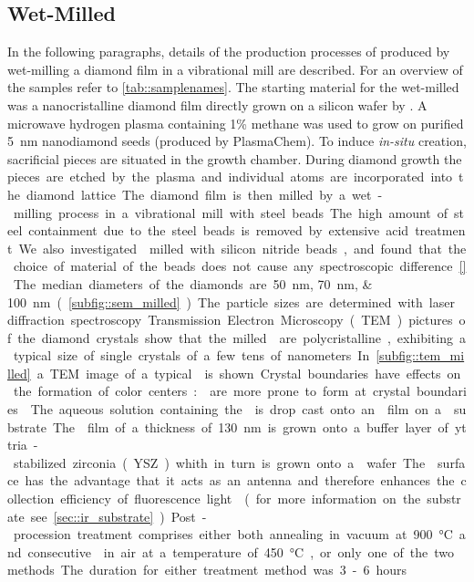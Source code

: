 	\subsection{Wet-Milled \cvd \Nds}\label{subsec::milled_nds}
	In the following paragraphs, details of the production processes of \nd produced by wet-milling a \CVD diamond film in a vibrational mill are described. 
	For an overview of the samples refer to \autoref{tab::samplenames}.
	The starting material for the wet-milled \nds was a nanocristalline diamond film \cite{Williams2006a} directly grown on a silicon wafer by \CVD. 
	A microwave hydrogen plasma containing 1\% methane was used to grow on purified \SI{5}{\nano\meter} nanodiamond seeds (produced by PlasmaChem).
	To induce \textit{in-situ} \siv creation, sacrificial \Si pieces are situated in the growth chamber.
	During diamond growth the \si pieces are etched by the plasma and individual atoms are incorporated into the diamond lattice.
	The diamond film is then milled by a wet-milling process in a vibrational mill with steel beads.
	The high amount of steel containment due to the steel beads is removed by extensive acid treatment.
	We also investigated \nds milled with silicon nitride beads, and found that the choice of material of the beads does not cause any spectroscopic difference \autoref{}.
	The median diameters of the diamonds are \SIlist{50; 70; 100}{\nano\meter} (\autoref{subfig::sem_milled}).
	The particle sizes are determined with laser diffraction spectroscopy.
	Transmission Electron Microscopy (TEM) pictures of the diamond crystals show that the milled \nds are polycristalline, exhibiting a typical size of single crystals of a few tens of nanometers.
	In \autoref{subfig::tem_milled} a TEM image of a typical \nd is shown.
	Crystal boundaries have effects on the formation of color centers:
	\sivs are more prone to form at crystal boundaries \cite{Zapol2001}.
	The aqueous solution containing the \nds is drop cast onto an \ir film on a \Si substrate.
	The \ir film of a thickness of \SI{130}{nm} is grown onto a buffer layer of yttria-stabilized zirconia (YSZ) whith in turn is grown onto a \Si wafer.
	The \ir surface has the advantage that it acts as an antenna and therefore enhances the collection efficiency of fluorescence light \cite{Neu2012a} (for more information on the substrate see \autoref{sec::ir_substrate}).
	Post-procession treatment comprises either both annealing in vacuum at \SI{900}{\degreeCelsius} and consecutive \ox in air at a temperature of \SI{450}{\degreeCelsius}, or only one of the two methods.
	The duration for either treatment method was 3-6 hours.
	\\
